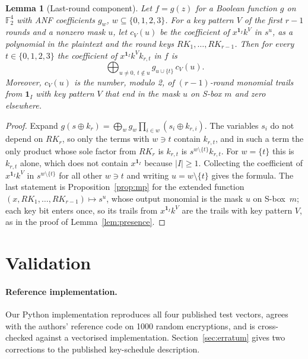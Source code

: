 \documentclass[11pt,a4paper]{article}
\newtheorem{lemma}{Lemma}
\theoremstyle{definition}
\theoremstyle{remark}
\newcommand{\F}{\mathbb{F}_2}
\begin{document}
\begin{lemma}[Last-round component]\label{lem:component}
Let $f=g(z)$ for a Boolean function $g$ on $\F^4$ with ANF coefficients $g_w$, $w\subseteq\{0,1,2,3\}$. For a key pattern $V$ of the first $r-1$ rounds and a nonzero mask $u$, let $c_V(u)$ be the coefficient of $x^{\mathbf 1_I}k^V$ in $s^u$, as a polynomial in the plaintext and the round keys $RK_1,\dots,RK_{r-1}$. Then for every $t\in\{0,1,2,3\}$ the coefficient of $x^{\mathbf 1_I}k^{V}k_{r,t}$ in $f$ is
\[
\bigoplus_{u\neq0,\ t\notin u} g_{u\cup\{t\}}\,c_V(u).
\]
Moreover, $c_V(u)$ is the number, modulo 2, of $(r-1)$-round monomial trails from $\mathbf 1_I$ with key pattern $V$ that end in the mask $u$ on S-box $m$ and zero elsewhere.
\end{lemma}
\begin{proof}
Expand $g(s\oplus k_r)=\bigoplus_w g_w\prod_{i\in w}(s_i\oplus k_{r,i})$. The variables $s_i$ do not depend on $RK_r$, so only the terms with $w\ni t$ contain $k_{r,t}$, and in such a term the only product whose sole factor from $RK_r$ is $k_{r,t}$ is $s^{w\setminus\{t\}}k_{r,t}$. For $w=\{t\}$ this is $k_{r,t}$ alone, which does not contain $x^{\mathbf 1_I}$ because $|I|\ge1$. Collecting the coefficient of $x^{\mathbf 1_I}k^V$ in $s^{w\setminus\{t\}}$ for all other $w\ni t$ and writing $u=w\setminus\{t\}$ gives the formula. The last statement is Proposition~\ref{prop:mp} for the extended function $(x,RK_1,\dots,RK_{r-1})\mapsto s^u$, whose output monomial is the mask $u$ on S-box~$m$; each key bit enters once, so its trails from $x^{\mathbf 1_I}k^V$ are the trails with key pattern $V$, as in the proof of Lemma~\ref{lem:presence}.
\end{proof}

\section{Validation}\label{sec:validation}

\paragraph{Reference implementation.} Our Python implementation reproduces all four published test vectors, agrees with the authors' reference code on 1000 random encryptions, and is cross-checked against a vectorised implementation. Section~\ref{sec:erratum} gives two corrections to the published key-schedule description.
\end{document}
